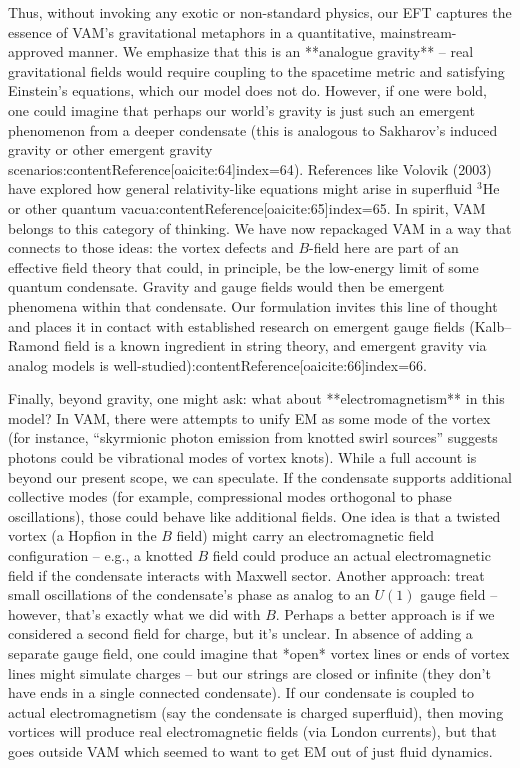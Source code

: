 \documentclass[12pt]{article}
\begin{document}
Thus, without invoking any exotic or non-standard physics, our EFT captures the essence of VAM’s gravitational metaphors in a quantitative, mainstream-approved manner. We emphasize that this is an **analogue gravity** – real gravitational fields would require coupling to the spacetime metric and satisfying Einstein’s equations, which our model does not do. However, if one were bold, one could imagine that perhaps our world’s gravity is just such an emergent phenomenon from a deeper condensate (this is analogous to Sakharov’s induced gravity or other emergent gravity scenarios:contentReference[oaicite:64]{index=64}). References like Volovik (2003) have explored how general relativity-like equations might arise in superfluid $^3$He or other quantum vacua:contentReference[oaicite:65]{index=65}. In spirit, VAM belongs to this category of thinking. We have now repackaged VAM in a way that connects to those ideas: the vortex defects and $B$-field here are part of an effective field theory that could, in principle, be the low-energy limit of some quantum condensate. Gravity and gauge fields would then be emergent phenomena within that condensate. Our formulation invites this line of thought and places it in contact with established research on emergent gauge fields (Kalb–Ramond field is a known ingredient in string theory, and emergent gravity via analog models is well-studied):contentReference[oaicite:66]{index=66}.

Finally, beyond gravity, one might ask: what about **electromagnetism** in this model? In VAM, there were attempts to unify EM as some mode of the vortex (for instance, “skyrmionic photon emission from knotted swirl sources” suggests photons could be vibrational modes of vortex knots). While a full account is beyond our present scope, we can speculate. If the condensate supports additional collective modes (for example, compressional modes orthogonal to phase oscillations), those could behave like additional fields. One idea is that a twisted vortex (a Hopfion in the $B$ field) might carry an electromagnetic field configuration – e.g., a knotted $B$ field could produce an actual electromagnetic field if the condensate interacts with Maxwell sector. Another approach: treat small oscillations of the condensate’s phase as analog to an $U(1)$ gauge field – however, that’s exactly what we did with $B$. Perhaps a better approach is if we considered a second field for charge, but it’s unclear. In absence of adding a separate gauge field, one could imagine that *open* vortex lines or ends of vortex lines might simulate charges – but our strings are closed or infinite (they don’t have ends in a single connected condensate). If our condensate is coupled to actual electromagnetism (say the condensate is charged superfluid), then moving vortices will produce real electromagnetic fields (via London currents), but that goes outside VAM which seemed to want to get EM out of just fluid dynamics. 
\end{document}
